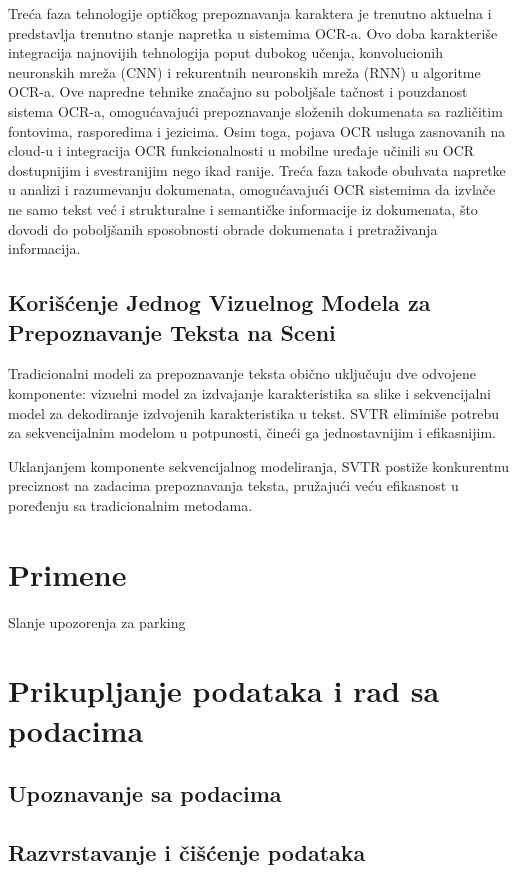 \documentclass[a4paper,12pt]{article}
\begin{document}
	Treća faza tehnologije optičkog prepoznavanja karaktera je trenutno aktuelna i predstavlja trenutno stanje napretka u sistemima OCR-a. Ovo doba karakteriše integracija najnovijih tehnologija poput dubokog učenja, konvolucionih neuronskih mreža (CNN) i rekurentnih neuronskih mreža (RNN) u algoritme OCR-a. Ove napredne tehnike značajno su poboljšale tačnost i pouzdanost sistema OCR-a, omogućavajući prepoznavanje složenih dokumenata sa različitim fontovima, rasporedima i jezicima. Osim toga, pojava OCR usluga zasnovanih na cloud-u i integracija OCR funkcionalnosti u mobilne uređaje učinili su OCR dostupnijim i svestranijim nego ikad ranije. Treća faza takođe obuhvata napretke u analizi i razumevanju dokumenata, omogućavajući OCR sistemima da izvlače ne samo tekst već i strukturalne i semantičke informacije iz dokumenata, što dovodi do poboljšanih sposobnosti obrade dokumenata i pretraživanja informacija.

	\subsection{Korišćenje Jednog Vizuelnog Modela za Prepoznavanje Teksta na Sceni}
	
	Tradicionalni modeli za prepoznavanje teksta obično uključuju dve odvojene komponente: vizuelni model za izdvajanje karakteristika sa slike i sekvencijalni model za dekodiranje izdvojenih karakteristika u tekst. SVTR eliminiše potrebu za sekvencijalnim modelom u potpunosti, čineći ga jednostavnijim i efikasnijim.
	
	Uklanjanjem komponente sekvencijalnog modeliranja, SVTR postiže konkurentnu preciznost na zadacima prepoznavanja teksta, pružajući veću efikasnost u poređenju sa tradicionalnim metodama.
	
	\newpage
	
	\section{Primene}
	Slanje upozorenja za parking
	\newpage
	
	\section{Prikupljanje podataka i rad sa podacima}
	\subsection{Upoznavanje sa podacima}
	\subsection{Razvrstavanje i čišćenje podataka}
\end{document}
